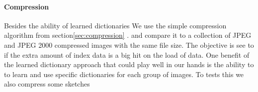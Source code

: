 \paragraph{Compression}
Besides the ability of learned dictionaries 
We use the simple compression algorithm from section\ref{sec:compression} .
and compare it to a collection of JPEG and JPEG 2000 compressed images with the
same file size. 
The objective is see to if the extra amount of index data is a big hit on the
load of data.
One benefit of the learned dictionary approach that could play well in our
hands is the ability to to learn and use specific dictionaries for each group of
images. To tests this we also compress some sketches 


